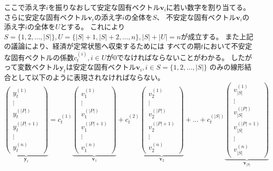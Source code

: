 ここで添え字\(i\)を振りなおして安定な固有ベクトル\(\mathbf{v}_i\)に若い数字を割り当てる。
さらに安定な固有ベクトル\(\mathbf{v}_i\)の添え字\(i\)の全体を\(S\)、
不安定な固有ベクトル\(\mathbf{v}_i\)の添え字\(i\)の全体を\(U\)とする。
これにより\(S=\{1,2,\dots,|S|\},U=\{|S|+1,|S|+2,\dots,n\},|S|+|U|=n\)が成立する。
また上記の議論により、経済が定常状態へ収束するためには
すべての期\(t\)において不安定な固有ベクトルの係数\(c_t^{(i)},i\in U\)が\(0\)でなければならないことがわかる。
したがって変数ベクトル\(\mathbf{y}_t\)は安定な固有ベクトル\(\mathbf{v}_i, i\in S=\{1,2,\dots,|S|\}\)
のみの線形結合として以下のように表現されなければならない。
\begin{equation}
\label{form:chapter4_method_component_display_final}
    \underbrace{
        \begin{pmatrix}
            y_t^{(1)} \\
            \vdots \\
            y_t^{(|P|)} \\
            \hline
            y_t^{(|P|+1)} \\
            \vdots \\
            y_t^{(n)}
        \end{pmatrix}
    }_{\mathbf{y}_t}
    =
    c_t^{(1)}
    \underbrace{
        \begin{pmatrix}
            v_1^{(1)} \\
            \vdots \\
            v_1^{(|P|)} \\
            \hline
            v_1^{(|P|+1)} \\
            \vdots \\
            v_1^{(n)}
        \end{pmatrix}
    }_{\mathbf{v}_1}
    +
    c_t^{(2)}
    \underbrace{
        \begin{pmatrix}
            v_2^{(1)} \\
            \vdots \\
            v_2^{(|P|)} \\
            \hline
            v_2^{(|P|+1)} \\
            \vdots \\
            v_2^{(n)}
        \end{pmatrix}
    }_{\mathbf{v}_2}
    + \dots +
    c_t^{(|S|)}
    \underbrace{
        \begin{pmatrix}
            v_{|S|}^{(1)} \\
            \vdots \\
            v_{|S|}^{(|P|)} \\
            \hline
            v_{|S|}^{(|P|+1)} \\
            \vdots \\
            v_{|S|}^{(n)}
        \end{pmatrix}
    }_{\mathbf{v}_{|S|}}
\end{equation}

